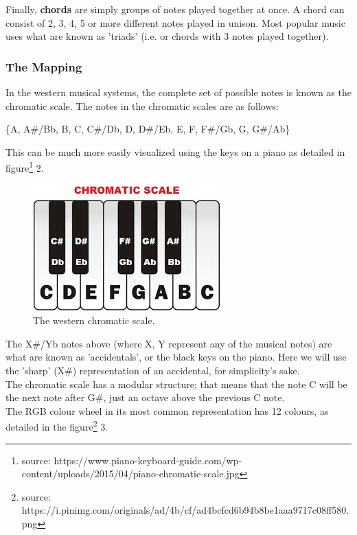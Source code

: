 \documentclass{article}
\begin{document}
Finally, \textbf{chords} are simply groups of notes played together at once. A chord can consist of 2, 3, 4, 5 or more different notes played in unison. Most popular music uses what are known as 'triads' (i.e. or chords with 3 notes played together).

\subsubsection{The Mapping}

In the western musical systems, the complete set of possible notes is known as the chromatic scale. The notes in the chromatic scales are as follows:

\begin{center}
    \{A, A\#/Bb, B, C, C\#/Db, D, D\#/Eb, E, F, F\#/Gb, G, G\#/Ab\}
\end{center}

This can be much more easily visualized using the keys on a piano as detailed in figure\footnote{source: https://www.piano-keyboard-guide.com/wp-content/uploads/2015/04/piano-chromatic-scale.jpg} 2.\\

\begin{figure}
    \centering
    \includegraphics{chromatic.jpg}
    \caption{The western chromatic scale.}
    \label{fig:chroma}
\end{figure}

The X\#/Yb notes above (where {X, Y} represent any of the musical notes) are what are known as 'accidentals', or the black keys on the piano. Here we will use the 'sharp' (X\#) representation of an accidental, for simplicity's sake.\\

The chromatic scale has a modular structure; that means that the note C will be the next note after G\#, just an octave above the previous C note.\\

The RGB colour wheel in its most common representation has 12 colours, as detailed in the figure\footnote{source: https://i.pinimg.com/originals/ad/4b/cf/ad4bcfcd6b94b8be1aaa9717c08ff580.png} 3.
\end{document}
